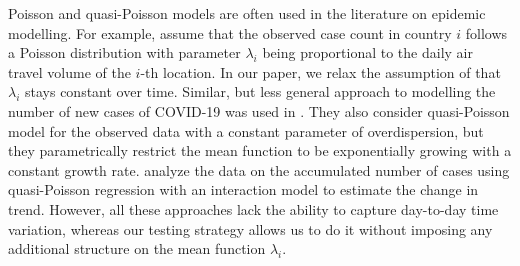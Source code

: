 \documentclass[a4paper,12pt]{article}
\numberwithin{equation}{section}
\begin{document}
Poisson and quasi-Poisson models are often used in the literature on epidemic modelling. For example, \cite{De2020} assume that the observed case count in country $i$ follows a Poisson distribution with parameter $\lambda_i$ being proportional to the daily air travel volume of the $i$-th location. In our paper, we relax the assumption of \cite{De2020} that $\lambda_i$ stays constant over time. Similar, but less general approach to modelling the number of new cases of COVID-19 was used in \cite{Pellis2020}. They also consider quasi-Poisson model for the observed data with a constant parameter of overdispersion, but they parametrically restrict the mean function to be exponentially growing with a constant growth rate. \cite{Tobias2020} analyze the data on the accumulated number of cases using quasi-Poisson regression with an interaction model to estimate the change in trend. However, all these approaches lack the ability to capture day-to-day time variation, whereas our testing strategy allows us to do it without imposing any additional structure on the mean function $\lambda_i$.
 
\end{document}
